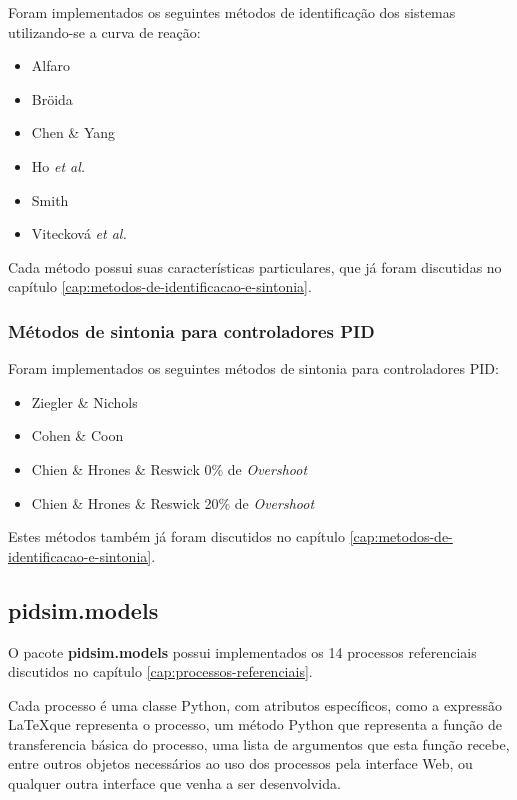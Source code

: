             Foram implementados os seguintes métodos de identificação dos sistemas utilizando-se
            a curva de reação:

            \begin{itemize}
                \item Alfaro
                \item Bröida
                \item Chen \& Yang
                \item Ho \textit{et al.}
                \item Smith
                \item Vitecková \textit{et al.}
            \end{itemize}

            Cada método possui suas características particulares, que já foram discutidas no capítulo
            \ref{cap:metodos-de-identificacao-e-sintonia}.

        \subsubsection{Métodos de sintonia para controladores \acs{PID}}
            
            Foram implementados os seguintes métodos de sintonia para controladores \acs{PID}:

            \begin{itemize}
                \item Ziegler \& Nichols
                \item Cohen \& Coon
                \item Chien \& Hrones \& Reswick 0\% de \textit{Overshoot}
                \item Chien \& Hrones \& Reswick 20\% de \textit{Overshoot}
            \end{itemize}

            Estes métodos também já foram discutidos no capítulo
            \ref{cap:metodos-de-identificacao-e-sintonia}.

        \subsection{pidsim.models}
            
            O pacote \textbf{pidsim.models} possui implementados os 14 processos referenciais
            discutidos no capítulo \ref{cap:processos-referenciais}.

            Cada processo é uma classe Python, com atributos específicos, como a expressão
            \LaTeX que representa o processo, um método Python que representa a função de
            transferencia básica do processo, uma lista de argumentos que esta função recebe,
            entre outros objetos necessários ao uso dos processos pela interface Web, ou qualquer
            outra interface que venha a ser desenvolvida.

